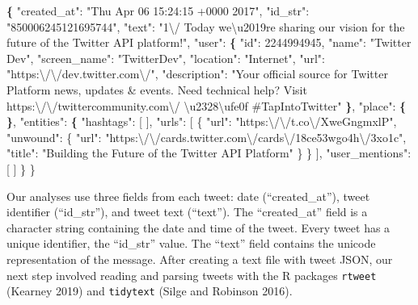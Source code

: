 \documentclass[
]{article}
\newenvironment{Shaded}{\begin{snugshade}}{\end{snugshade}}
\newcommand{\BuiltInTok}[1]{#1}
\newcommand{\ExtensionTok}[1]{#1}
\newcommand{\KeywordTok}[1]{\textcolor[rgb]{0.13,0.29,0.53}{\textbf{#1}}}
\newcommand{\NormalTok}[1]{#1}
\newcommand{\StringTok}[1]{\textcolor[rgb]{0.31,0.60,0.02}{#1}}
\begin{document}
\begin{Shaded}
\begin{Highlighting}[]
\KeywordTok{\{}
  \StringTok{"created_at"}\NormalTok{: }\StringTok{"Thu Apr 06 15:24:15 +0000 2017"}\NormalTok{,}
  \StringTok{"id_str"}\NormalTok{: }\StringTok{"850006245121695744"}\NormalTok{,}
  \StringTok{"text"}\NormalTok{: }\StringTok{"1\textbackslash{}/ Today we\textbackslash{}u2019re sharing our vision for the future of the Twitter API platform!"}\NormalTok{,}
  \StringTok{"user"}\NormalTok{: }\KeywordTok{\{}
    \StringTok{"id"}\NormalTok{: }\ExtensionTok{2244994945}\NormalTok{,}
    \StringTok{"name"}\NormalTok{: }\StringTok{"Twitter Dev"}\NormalTok{,}
    \StringTok{"screen_name"}\NormalTok{: }\StringTok{"TwitterDev"}\NormalTok{,}
    \StringTok{"location"}\NormalTok{: }\StringTok{"Internet"}\NormalTok{,}
    \StringTok{"url"}\NormalTok{: }\StringTok{"https:\textbackslash{}/\textbackslash{}/dev.twitter.com\textbackslash{}/"}\NormalTok{,}
    \StringTok{"description"}\NormalTok{: }\StringTok{"Your official source for Twitter Platform news, updates & events. }
\StringTok{    Need technical help? Visit https:\textbackslash{}/\textbackslash{}/twittercommunity.com\textbackslash{}/ \textbackslash{}u2328\textbackslash{}ufe0f }
\StringTok{    #TapIntoTwitter"}
  \KeywordTok{\}}\NormalTok{,}
  \StringTok{"place"}\NormalTok{: }\KeywordTok{\{}   
  \KeywordTok{\}}\NormalTok{,}
  \StringTok{"entities"}\NormalTok{: }\KeywordTok{\{}
    \StringTok{"hashtags"}\NormalTok{:}\BuiltInTok{ [}      
\NormalTok{    ],}
    \StringTok{"urls"}\NormalTok{: [}
\NormalTok{      \{}
        \StringTok{"url"}\NormalTok{: }\StringTok{"https:\textbackslash{}/\textbackslash{}/t.co\textbackslash{}/XweGngmxlP"}\NormalTok{,}
        \StringTok{"unwound"}\NormalTok{: \{}
          \StringTok{"url"}\NormalTok{: }\StringTok{"https:\textbackslash{}/\textbackslash{}/cards.twitter.com\textbackslash{}/cards\textbackslash{}/18ce53wgo4h\textbackslash{}/3xo1c"}\NormalTok{,}
          \StringTok{"title"}\NormalTok{: }\StringTok{"Building the Future of the Twitter API Platform"}
\NormalTok{        \}}
\NormalTok{      \}}
\NormalTok{    ],}
    \StringTok{"user_mentions"}\NormalTok{: [     }
\NormalTok{    ]}
\NormalTok{  \}}
\NormalTok{\}}
\end{Highlighting}
\end{Shaded}

Our analyses use three fields from each tweet: date (``created\_at''), tweet identifier
(``id\_str''), and tweet text (``text''). The ``created\_at'' field is a character string containing
the date and time of the tweet. Every tweet has a unique identifier, the ``id\_str'' value. The
``text'' field contains the unicode representation of the message. After creating a text file
with tweet JSON, our next step involved reading and parsing tweets with the R
packages \texttt{rtweet} (Kearney 2019) and \texttt{tidytext} (Silge and Robinson 2016).
\end{document}
